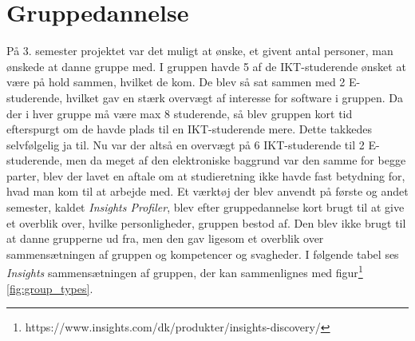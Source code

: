 \documentclass[a4paper,12pt,fleqn,oneside]{article}
\begin{document}
\section{Gruppedannelse}
På 3. semester projektet var det muligt at ønske, et givent antal personer, man ønskede at danne gruppe med. I gruppen havde 5 af de IKT-studerende ønsket at være på hold sammen, hvilket de kom. De blev så sat sammen med 2 E-studerende, hvilket gav en stærk overvægt af interesse for software i gruppen. Da der i hver gruppe må være max 8 studerende, så blev gruppen kort tid efterspurgt om de havde plads til en IKT-studerende mere. Dette takkedes selvfølgelig ja til. Nu var der altså en overvægt på 6 IKT-studerende til 2 E-studerende, men da meget af den elektroniske baggrund var  den samme for begge parter, blev der lavet en aftale om at studieretning ikke havde fast betydning for, hvad man kom til at arbejde med. Et værktøj der blev anvendt på første og andet semester, kaldet \textit{Insights Profiler}, blev efter gruppedannelse kort brugt til at give et overblik over, hvilke personligheder, gruppen bestod af. Den blev ikke brugt til at danne grupperne ud fra, men den gav ligesom et overblik over sammensætningen af gruppen og kompetencer og svagheder. I
følgende tabel ses \textit{Insights} sammensætningen af gruppen, der kan sammenlignes med figur\footnote{https://www.insights.com/dk/produkter/insights-discovery/} \ref{fig:group_types}.
\begin{table}[H]
\centering
{}
\caption{Sammensætning af Insights typer i gruppen}
\label{table_group_types}
\end{table}
\end{document}
